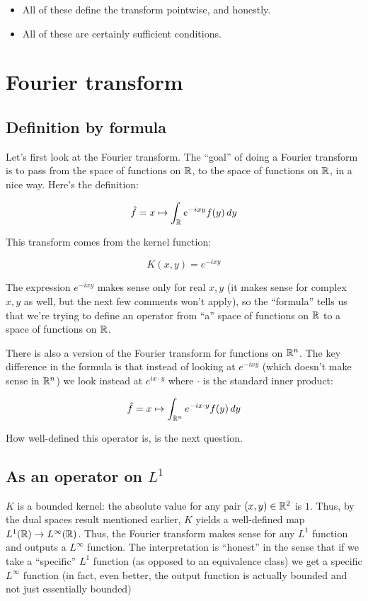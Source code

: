 \documentclass[a4paper]{amsart}
\begin{document}
\begin{itemize}

\item All of these define the transform pointwise, and honestly.

\item All of these are certainly sufficient conditions.

\end{itemize}


\section{Fourier transform}

\subsection{Definition by formula}

Let's first look at the Fourier transform. The ``goal'' of doing a
Fourier transform is to pass from the space of functions on $\mathbb{R}$, to
the space of functions on $\mathbb{R}$, in a nice way. Here's the definition:

$$\hat{f} = x \mapsto \int_{\mathbb{R}} e^{-ixy} f(y) \, dy$$

This transform comes from the kernel function:

$$K(x,y) = e^{-ixy}$$

The expression $e^{-ixy}$ makes sense only for real $x,y$ (it makes
sense for complex $x,y$ as well, but the next few comments won't
apply), so the ``formula'' tells us that we're trying to define an
operator from ``a'' space of functions on $\mathbb{R}$ to a space of functions
on $\mathbb{R}$. 

There is also a version of the Fourier transform for functions on
$\mathbb{R}^n$.  The key difference in the formula is that instead of looking
at $e^{-ixy}$ (which doesn't make sense in $\mathbb{R}^n$) we look instead at
$e^{ix\cdot y}$ where $\cdot$ is the standard inner product:

$$\hat{f} = x \mapsto \int_{\mathbb{R}^n} e^{-ix \cdot y} f(y) \, dy$$

How well-defined this operator is, is the next question.

\subsection{As an operator on $L^1$}

$K$ is a bounded kernel: the absolute value for any pair $(x,y) \in
\mathbb{R}^2$ is $1$. Thus, by the dual spaces result mentioned earlier, $K$
yields a well-defined map $L^1(\mathbb{R}) \to L^\infty(\mathbb{R})$. Thus, the
Fourier transform makes sense for any $L^1$ function and outputs a
$L^\infty$ function. The interpretation is ``honest'' in the sense
that if we take a ``specific'' $L^1$ function (as opposed to an
equivalence class) we get a specific $L^\infty$ function (in fact, even
better, the output function is actually bounded and not just
essentially bounded)
\end{document}
